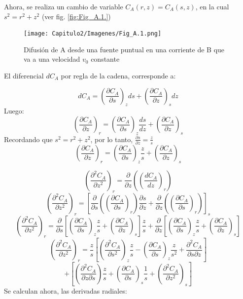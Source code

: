 Ahora, se realiza un cambio de variable $C_A(r,z)=C_A(s,z)$, en la cual $s^2=r^2+z^2$ (ver fig. \eqref{fig:Fig_A.1.})
\begin{figure}[H]
    \centering
    \texttt{[image: Capitulo2/Imagenes/Fig\_A.1.png]}
    \caption{Difusión de A desde una fuente puntual en una corriente de B que va a una velocidad $v_0$ constante}
    \label{fig:Fig_A.1.}
\end{figure}

El diferencial $dC_A$ por regla de la cadena, corresponde a:

\begin{equation*}
    dC_A=(\frac{\partial C_A}{\partial s})_zds+(\frac{\partial C_A}{\partial z})_sdz
\end{equation*}
Luego:
\begin{equation*}
    (\frac{\partial C_A}{\partial z})_r=(\frac{\partial C_A}{\partial s})_z\frac{ds}{dz}+(\frac{\partial C_A}{\partial z})_s
\end{equation*}
Recordando que $s^2=r^2+z^2$, por lo tanto, $\frac{\partial s}{\partial z}=\frac{z}{s}$
\begin{equation*}
    (\frac{\partial C_A}{\partial z})_r=(\frac{\partial C_A}{\partial s})_z\frac{z}{s}+(\frac{\partial C_A}{\partial z})_s
\end{equation*}

\begin{equation*}
    (\frac{\partial^2C_A}{\partial z^2})_r=\frac{\partial}{\partial z}((\frac{dC_A}{dz})_r)
\end{equation*}
\begin{equation*}
    (\frac{\partial^2C_A}{\partial z^2})_r=[\frac{\partial}{\partial s}((\frac{\partial C_A}{\partial s})_r)\frac{\partial s}{\partial z}+\frac{\partial }{\partial z}((\frac{\partial C_A}{\partial s})_r)]_s
\end{equation*}
\begin{equation*}
    (\frac{\partial^2C_A}{\partial z^2})_r=\frac{\partial}{\partial s}[(\frac{\partial C_A}{\partial s})_z\frac{z}{s}+(\frac{\partial C_A}{\partial z})_s]\frac{z}{s}+\frac{\partial }{\partial z}[(\frac{\partial C_A}{\partial s})_z\frac{z}{s}+(\frac{\partial C_A}{\partial z})_s]
\end{equation*}
\begin{equation*}
    (\frac{\partial^2C_A}{\partial z^2})_r=\frac{z}{s}[(\frac{\partial^2 C_A}{\partial s^2})_z\frac{z}{s}-(\frac{\partial C_A}{\partial s})_z\frac{z}{s^2}+\frac{\partial^2C_A}{\partial s \partial z}]
\end{equation*}
\begin{equation*}
    +[(\frac{\partial^2C_A}{\partial z \partial s})\frac{z}{s}+(\frac{\partial C_A}{\partial s})_s\frac{1}{s}+(\frac{\partial^2C_A}{\partial z^2})_s]
\end{equation*}
Se calculan ahora, las derivadas radiales:

